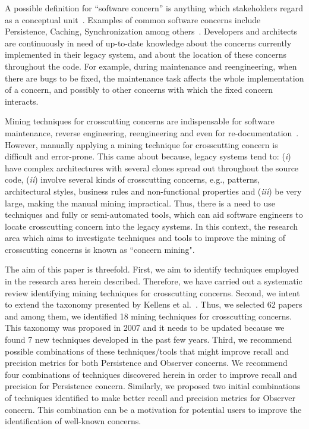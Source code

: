 A possible definition for ``software concern'' is anything which stakeholders regard as a conceptual unit~\cite{Eaddy}. Examples of common software concerns include Persistence, Caching, Synchronization among others~\cite{valterWASP1}. Developers and architects are continuously in need of up-to-date knowledge about the concerns currently implemented in their legacy system, and about the location of these concerns throughout the code. For example, during maintenance and reengineering, when there are bugs to be fixed, the maintenance task affects the whole implementation of a concern, and possibly to other concerns with which the fixed concern interacts.

Mining techniques for crosscutting concerns are indispensable for software maintenance, reverse engineering, reengineering and even for re-documentation~\cite{Marin2007}. However, manually applying a mining technique for crosscutting concern is difficult and error-prone. This came about because, legacy systems tend to: (\textit{i}) have complex architectures with several clones spread out throughout the source code, (\textit{ii}) involve several kinds of crosscutting concerns, e.g., patterns, architectural styles, business rules and non-functional properties and (\textit{iii}) be very large, making the manual mining impractical. Thus, there is a need to use techniques and fully or semi-automated tools, which can aid software engineers to locate crosscutting concern into the legacy systems. In this context, the research area which aims to investigate techniques and tools to improve the mining of crosscutting concerns is known as ``concern mining".

The aim of this paper is threefold. First, we aim to identify techniques employed in the research area herein described. Therefore, we have carried out a systematic review identifying  mining techniques for crosscutting concerns. Second, we intent to extend the taxonomy presented by Kellens et al.~\cite{Kellens}. Thus, we selected 62 papers and among them, we identified 18 mining techniques for crosscutting concerns. This taxonomy was proposed in 2007 and it needs to be updated because we found 7 new techniques developed in the past few years. Third, we recommend possible combinations of these techniques/tools that might improve recall and precision metrics for both Persistence and Observer concerns. We recommend four combinations of techniques discovered herein in order to improve recall and precision for Persistence concern. Similarly, we proposed two initial combinations of techniques identified to make better recall and precision metrics for Observer concern. This combination can be a motivation for potential users to improve the identification of well-known concerns.


